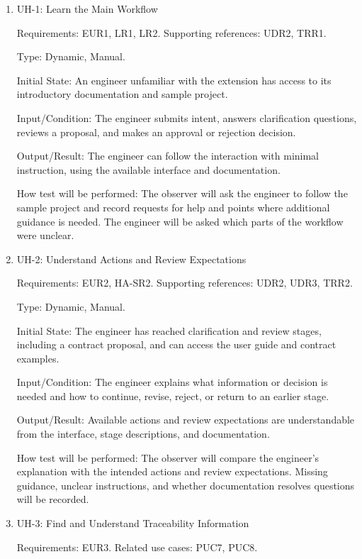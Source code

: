 \documentclass[12pt, titlepage]{article}
\begin{document}
\begin{enumerate}

\item{UH-1: Learn the Main Workflow\\}

Requirements: EUR1, LR1, LR2. Supporting references: UDR2, TRR1.

Type: Dynamic, Manual.

Initial State: An engineer unfamiliar with the extension has access to its
introductory documentation and sample project.

Input/Condition: The engineer submits intent, answers clarification questions,
reviews a proposal, and makes an approval or rejection decision.

Output/Result: The engineer can follow the interaction with minimal
instruction, using the available interface and documentation.

How test will be performed: The observer will ask the engineer to follow the
sample project and record requests for help and points where additional
guidance is needed. The engineer will be asked which parts of the workflow
were unclear.

\item{UH-2: Understand Actions and Review Expectations\\}

Requirements: EUR2, HA-SR2. Supporting references: UDR2, UDR3, TRR2.

Type: Dynamic, Manual.

Initial State: The engineer has reached clarification and review stages,
including a contract proposal, and can access the user guide and contract
examples.

Input/Condition: The engineer explains what information or decision is needed
and how to continue, revise, reject, or return to an earlier stage.

Output/Result: Available actions and review expectations are understandable
from the interface, stage descriptions, and documentation.

How test will be performed: The observer will compare the engineer's
explanation with the intended actions and review expectations. Missing
guidance, unclear instructions, and whether documentation resolves questions
will be recorded.

\item{UH-3: Find and Understand Traceability Information\\}

Requirements: EUR3. Related use cases: PUC7, PUC8.


\end{enumerate}
\end{document}
